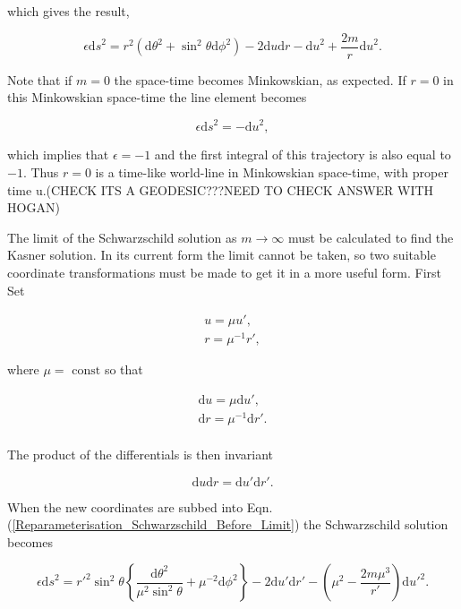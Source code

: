 \noindent which gives the result,

\begin{equation}\label{Reparameterisation_Schwarzschild_Before_Limit}
\epsilon {\mathrm{d}s}^{2} = r^2 ({\mathrm{d}\theta}^2 + {{\sin}^2 \theta}{\mathrm{d} \phi}^2) - 2 \mathrm{d}u \mathrm{d}r - {\mathrm{d}u}^{2} + \frac{2m}{r} {\mathrm{d}u}^{2}. 
\end{equation}

Note that if $m = 0$ the space-time becomes Minkowskian, as expected. If $r = 0$ in this Minkowskian space-time the line element becomes

$$ \epsilon {\mathrm{d}s}^2 = - {\mathrm{d}u}^{2},$$

\noindent which implies that $\epsilon = -1$ and the first integral of this trajectory is also equal to $-1$. Thus $r = 0$ is a time-like world-line in Minkowskian space-time, with proper time u.(CHECK ITS A GEODESIC???NEED TO CHECK ANSWER WITH HOGAN)

The limit of the Schwarzschild solution as $m \rightarrow \infty$ must be calculated to find the Kasner solution. In its current form the limit cannot be taken, so two suitable coordinate transformations must be made to get it in a more useful form. First Set 

\begin{gather*} 
u = \mu u', \\
r = {\mu}^{-1} r',   
\end{gather*} 

\noindent where $\mu = \text{ const}$ so that
  
\begin{gather*} 
\mathrm{d}u = \mu \mathrm{d}u', \\
\mathrm{d}r = {\mu}^{-1} \mathrm{d}r'. \\
\end{gather*} 

\noindent The product of the differentials is then invariant

\begin{equation*}
{\mathrm{d}u}{\mathrm{d}r} = {\mathrm{d}u'}{\mathrm{d}r'}. 
\end{equation*}

\noindent When the new coordinates are subbed into Eqn.(\ref{Reparameterisation_Schwarzschild_Before_Limit}) the Schwarzschild solution becomes

\begin{equation}\label{Reparameterise_Schwarzschild_Next_Before_Limit}
\epsilon {\mathrm{d}s}^2 = {r'}^2 \sin^2 \theta \left\{ \frac{{\mathrm{d}\theta}^2}{\mu^2 \sin^2 \theta} +  \mu^{-2} {\mathrm{d} \phi}^2 \right\} - 2 {\mathrm{d}u'} {\mathrm{d}r'} - \left( \mu^2 - \frac{2 m \mu^3}{r'}\right) {\mathrm{d}u'}^2 . 
\end{equation}

